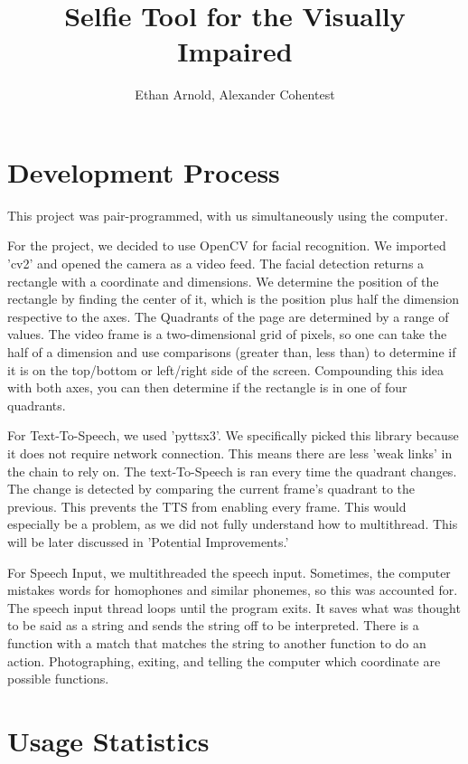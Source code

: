 \documentclass{article}
\title{Selfie Tool for the Visually Impaired}
\author{Ethan Arnold, Alexander Cohentest}
\begin{document}
\maketitle


\section{Development Process}
This project was pair-programmed, with us simultaneously using the computer.


For the project, we decided to use OpenCV for facial recognition.
We imported 'cv2' and opened the camera as a video feed.
The facial detection returns a rectangle with a coordinate and dimensions.
We determine the position of the rectangle by finding the center of it, which is the position plus half the dimension respective to the axes.
The Quadrants of the page are determined by a range of values.
The video frame is a two-dimensional grid of pixels, so one can take the half of a dimension and use comparisons (greater than, less than) to determine if it is on the top/bottom or left/right side of the screen.
Compounding this idea with both axes, you can then determine if the rectangle is in one of four quadrants.


For Text-To-Speech, we used 'pyttsx3'. We specifically picked this library because it does not require network connection.
This means there are less 'weak links' in the chain to rely on.
The text-To-Speech is ran every time the quadrant changes.
The change is detected by comparing the current frame's quadrant to the previous.
This prevents the TTS from enabling every frame.
This would especially be a problem, as we did not fully understand how to multithread. This will be later discussed in 'Potential Improvements.'

For Speech Input, we multithreaded the speech input.
Sometimes, the computer mistakes words for homophones and similar phonemes, so this was accounted for.
The speech input thread loops until the program exits. It saves what was thought to be said as a string and sends the string off to be interpreted.
There is a function with a match that matches the string to another function to do an action.
Photographing, exiting, and telling the computer which coordinate are possible functions.

\section{Usage Statistics}
\end{document}
